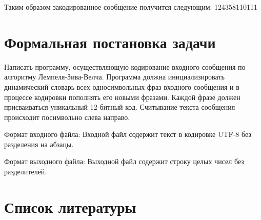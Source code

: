\documentclass{article}
\begin{document}
Таким образом закодированное сообщение получится следующим:
124358110111

\section{Формальная постановка задачи}

Написать программу, осуществляющую кодирование входного сообщения по алгоритму Лемпеля-Зива-Велча. Программа должна инициализировать динамический словарь всех односимвольных фраз входного сообщения и в процессе кодировки пополнять его новыми фразами. Каждой фразе должен присваиваться уникальный 12-битный код. Считывание текста сообщения происходит посимвольно слева направо. 

Формат входного файла:
Входной файл содержит текст в кодировке UTF-8 без разделения на абзацы.

Формат выходного файла:
Выходной файл содержит строку целых чисел без разделителей.

\section{Список литературы}
\end{document}
